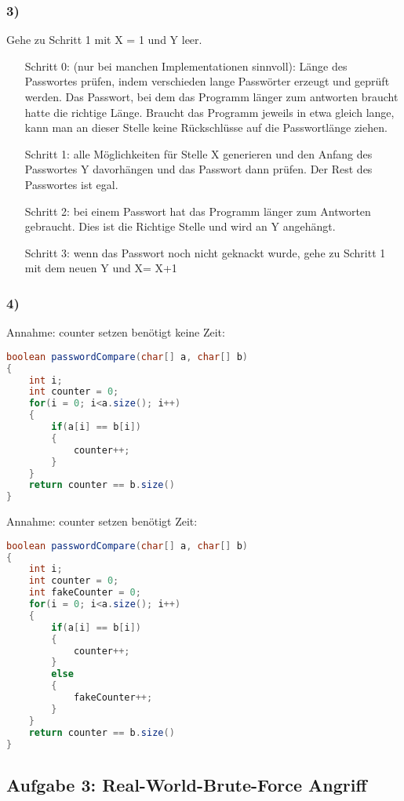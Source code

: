 \documentclass{article}
\begin{document}
\subsubsection*{3)}
Gehe zu Schritt 1 mit X = 1 und Y leer.
\begin{enumerate}
    \item[Schritt 0:] (nur bei manchen Implementationen sinnvoll): Länge des Passwortes prüfen, indem verschieden lange Passwörter erzeugt und geprüft werden.
Das Passwort, bei dem das Programm länger zum antworten braucht hatte die richtige Länge. Braucht das Programm jeweils in etwa gleich lange, kann man an dieser Stelle keine Rückschlüsse auf die Passwortlänge ziehen.
    \item[Schritt 1:] alle Möglichkeiten für Stelle X generieren und den Anfang des Passwortes Y davorhängen und das Passwort dann prüfen. Der Rest des Passwortes ist egal.
    \item[Schritt 2:] bei einem Passwort hat das Programm länger zum Antworten gebraucht. Dies ist die Richtige Stelle und wird an Y angehängt.
    \item[Schritt 3:] wenn das Passwort noch nicht geknackt wurde, gehe zu Schritt 1 mit dem neuen Y und X= X+1
\end{enumerate}
\subsubsection*{4)}
Annahme: counter setzen benötigt keine Zeit:
\begin{lstlisting}[language=Java]
boolean passwordCompare(char[] a, char[] b)
{
	int i;
	int counter = 0;
	for(i = 0; i<a.size(); i++)
	{
		if(a[i] == b[i])
		{
			counter++;
		}
	}
	return counter == b.size()
}
\end{lstlisting}
Annahme: counter setzen benötigt Zeit:
\begin{lstlisting}[language=Java]
boolean passwordCompare(char[] a, char[] b)
{
	int i;
	int counter = 0;
	int fakeCounter = 0;
	for(i = 0; i<a.size(); i++)
	{
		if(a[i] == b[i])
		{
			counter++;
		}
		else
		{
			fakeCounter++;
		}
	}
	return counter == b.size()
}
\end{lstlisting}
\subsection*{Aufgabe 3: Real-World-Brute-Force Angriff}
\end{document}
